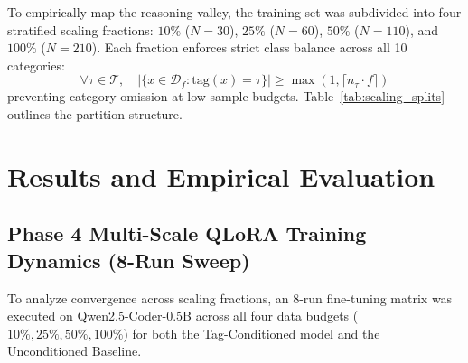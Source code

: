 \documentclass{ieeeaccess}
\begin{document}
To empirically map the reasoning valley, the training set was subdivided into four stratified scaling fractions: $10\%$ ($N=30$), $25\%$ ($N=60$), $50\%$ ($N=110$), and $100\%$ ($N=210$). Each fraction enforces strict class balance across all 10 categories:
\begin{equation}
\forall \tau \in \mathcal{T}, \quad |\{x \in \mathcal{D}_f : \text{tag}(x) = \tau\}| \ge \max(1, \lceil n_\tau \cdot f \rceil)
\end{equation}
preventing category omission at low sample budgets. Table~\ref{tab:scaling_splits} outlines the partition structure.

\begin{table}[!t]
\caption{Stratified Data Scaling Partitions for Reasoning Valley Mapping}
\label{tab:scaling_splits}
\centering
{}
\end{table}

\section{Results and Empirical Evaluation}
\label{sec:results}

\subsection{Phase 4 Multi-Scale QLoRA Training Dynamics (8-Run Sweep)}
To analyze convergence across scaling fractions, an 8-run fine-tuning matrix was executed on Qwen2.5-Coder-0.5B across all four data budgets ($10\%, 25\%, 50\%, 100\%$) for both the Tag-Conditioned model and the Unconditioned Baseline.
\end{document}
